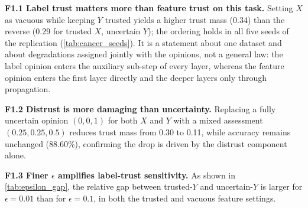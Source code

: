 \begin{tcolorbox}[title=Key findings -- Experiment 1, colback=gray!5, colframe=gray!40, fonttitle=\bfseries, left=4pt, right=4pt, top=4pt, bottom=4pt]
\textbf{F1.1 Label trust matters more than feature trust on this task.} Setting $X$ as vacuous
while keeping $Y$ trusted yields a higher trust mass (0.34) than the reverse
(0.29 for trusted $X$, uncertain $Y$); the ordering holds in all five seeds of the
replication (\cref{tab:cancer_seeds}). It is a statement about one dataset and about
degradations assigned jointly with the opinions, not a general law: the label opinion
enters the auxiliary sub-step of every layer, whereas the feature opinion enters the
first layer directly and the deeper layers only through propagation.

\medskip
\textbf{F1.2 Distrust is more damaging than uncertainty.} Replacing a fully
uncertain opinion $(0,0,1)$ for both $X$ and $Y$ with a mixed assessment
$(0.25, 0.25, 0.5)$ reduces trust mass from 0.30 to 0.11, while accuracy
remains unchanged (88.60\%), confirming the drop is driven by the distrust
component alone.

\medskip
\textbf{F1.3 Finer $\epsilon$ amplifies label-trust sensitivity.} As shown in
\cref{tab:epsilon_gap}, the relative gap between trusted-$Y$ and uncertain-$Y$
is larger for $\epsilon=0.01$ than for $\epsilon=0.1$, in both the trusted and
vacuous feature settings.
\end{tcolorbox}















